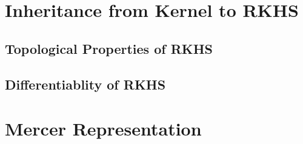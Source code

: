 \documentclass[a4paper,12pt]{article}
\theoremstyle{remark}
\theoremstyle{definition}
\theoremstyle{definition}
\theoremstyle{definition}
\begin{document}
\section{Inheritance from Kernel to RKHS}
\subsection{Topological Properties of RKHS}
\subsection{Differentiablity of RKHS}

\section{Mercer Representation}


\end{document}
